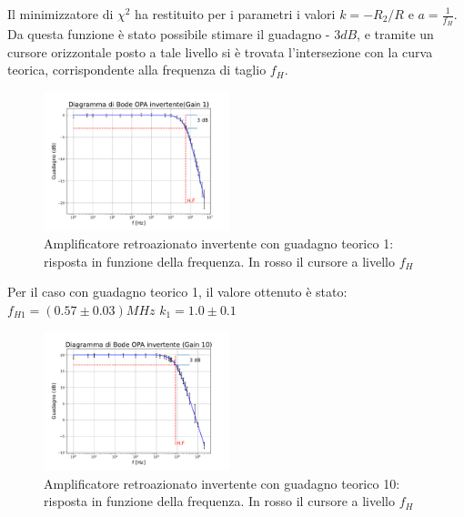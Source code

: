 \documentclass[journal]{IEEEtran}
\begin{document}
Il minimizzatore di $\chi^2$ ha restituito per i parametri i valori $k = -R_2/R$ e $a = \frac{1}{f_H}$. Da questa funzione è stato possibile stimare il guadagno - $3 dB$, e tramite un cursore orizzontale posto a tale livello si è trovata l'intersezione con la curva teorica, corrispondente alla frequenza di taglio $f_H$.

\begin{figure}[H]%
\begin{center}
\includegraphics[width=0.48\textwidth]{analysis/output/OPA-bode_gain1(mag).pdf}
\caption{Amplificatore retroazionato invertente con guadagno teorico 1: risposta in funzione della frequenza. In rosso il cursore a livello $f_H$}
\label{fig:closed_loop_inv_gain_1}
\end{center}
\end{figure}

Per il caso con guadagno teorico 1, il valore ottenuto è stato:
$f_{H1} = (0.57 \pm 0.03) MHz$
$k_1 = 1.0 \pm 0.1$

\begin{figure}[H]%
\begin {center}
\includegraphics[width=0.48\textwidth]{analysis/output/OPA-bode_gain10(mag).pdf}
\caption{Amplificatore retroazionato invertente con guadagno teorico 10: risposta in funzione della frequenza. In rosso il cursore a livello $f_H$ }
\label{fig:closed_loop_inv_gain_10}
\end {center}
\end{figure}

\end{document}
